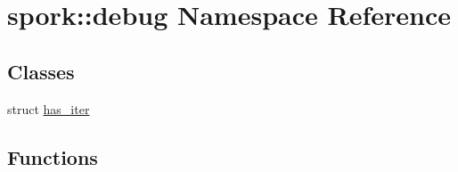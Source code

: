 \hypertarget{namespacespork_1_1debug}{}\section{spork\+:\+:debug Namespace Reference}
\label{namespacespork_1_1debug}
\subsection*{Classes}
\begin{DoxyCompactItemize}
\item 
struct \hyperlink{structspork_1_1debug_1_1has__iter}{has\+\_\+iter}
\end{DoxyCompactItemize}
\subsection*{Functions}

